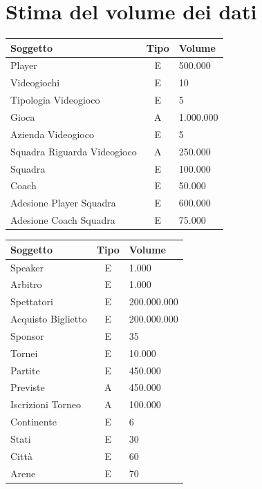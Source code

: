 \documentclass[a4paper,12pt]{report}
\begin{document}
\section{Stima del volume dei dati}
\renewcommand{\arraystretch}{1.5} %
\setlength{\arrayrulewidth}{0.5mm}%
\setlength{\tabcolsep}{10pt}%
\setlength\doublerulesep{0.15cm}%

\begin{tabular}{|m{2cm}|c|m{2cm}|}
	\hline\rowcolor{pink}
	Soggetto & Tipo & Volume\\
	\hline\hline
	
	Player & E & 500.000\\
	\hline
	Videogiochi & E & 10\\
	\hline
	Tipologia Videogioco & E & 5\\
	\hline
	Gioca & A & 1.000.000\\
	\hline
	Azienda Videogioco & E & 5\\
	\hline
	 Squadra Riguarda Videogioco & A & 250.000\\
	
	\hline
	\hline
	
	Squadra & E & 100.000\\
	\hline
	Coach & E & 50.000\\
	\hline
	Adesione Player Squadra& E & 600.000\\ 
	\hline
	Adesione Coach Squadra& E & 75.000\\ 
	
	\hline
\end{tabular}
\setlength\doublerulesep{0.28cm} %
\begin{tabular}{|m{2cm}|c|m{2cm}|}
	\hline\rowcolor{pink}
	Soggetto & Tipo & Volume\\
	\hline\hline
	Speaker & E & 1.000\\
	\hline
	Arbitro & E & 1.000\\
	\hline
	Spettatori & E & 200.000.000\\
	\hline
	Acquisto Biglietto & E & 200.000.000\\ 
	\hline
	Sponsor & E & 35\\
	
	\hline\hline
	
	Tornei & E & 10.000\\
	\hline
	Partite & E & 450.000\\
	\hline
	Previste & A & 450.000\\ 
	\hline
	Iscrizioni Torneo & A & 100.000\\ 
	\hline
	
	\hline\hline
	
	Continente & E & 6\\
	\hline
	Stati & E & 30\\
	\hline
	Città & E & 60\\ 
	\hline
	Arene & E & 70\\ 
	\hline
	
	
\end{tabular}
\end{document}
